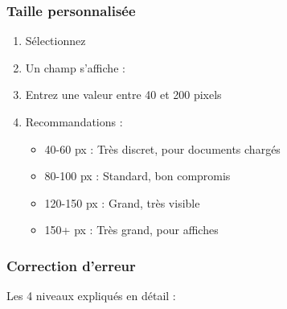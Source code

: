 \subsubsection{Taille personnalisée}

\begin{enumerate}[leftmargin=*]
    \item Sélectionnez 
    \item Un champ s'affiche : 
    \item Entrez une valeur entre 40 et 200 pixels
    \item Recommandations :
    \begin{itemize}
        \item 40-60 px : Très discret, pour documents chargés
        \item 80-100 px : Standard, bon compromis
        \item 120-150 px : Grand, très visible
        \item 150+ px : Très grand, pour affiches
    \end{itemize}
\end{enumerate}

\subsubsection{Correction d'erreur}

Les 4 niveaux expliqués en détail :

